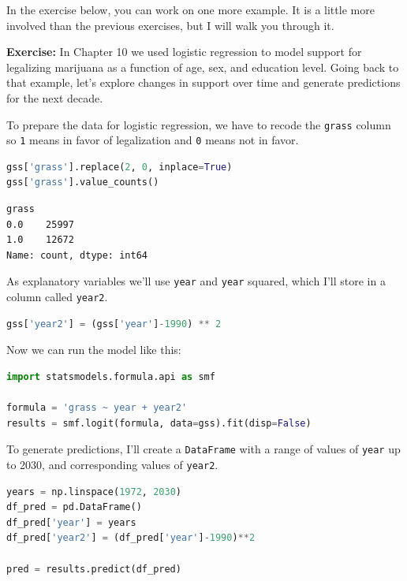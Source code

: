 In the exercise below, you can work on one more example. It is a little
more involved than the previous exercises, but I will walk you through
it.

\textbf{Exercise:} In Chapter 10 we used logistic regression to model
support for legalizing marijuana as a function of age, sex, and
education level. Going back to that example, let's explore changes in
support over time and generate predictions for the next decade.

To prepare the data for logistic regression, we have to recode the
\passthrough{\lstinline!grass!} column so \passthrough{\lstinline!1!}
means in favor of legalization and \passthrough{\lstinline!0!} means not
in favor.

\begin{lstlisting}[language=Python,style=source]
gss['grass'].replace(2, 0, inplace=True)
gss['grass'].value_counts()
\end{lstlisting}

\begin{lstlisting}[style=output]
grass
0.0    25997
1.0    12672
Name: count, dtype: int64
\end{lstlisting}

As explanatory variables we'll use \passthrough{\lstinline!year!} and
\passthrough{\lstinline!year!} squared, which I'll store in a column
called \passthrough{\lstinline!year2!}.

\begin{lstlisting}[language=Python,style=source]
gss['year2'] = (gss['year']-1990) ** 2
\end{lstlisting}

Now we can run the model like this:

\begin{lstlisting}[language=Python,style=source]
import statsmodels.formula.api as smf

formula = 'grass ~ year + year2'
results = smf.logit(formula, data=gss).fit(disp=False)
\end{lstlisting}

To generate predictions, I'll create a
\passthrough{\lstinline!DataFrame!} with a range of values of
\passthrough{\lstinline!year!} up to 2030, and corresponding values of
\passthrough{\lstinline!year2!}.

\begin{lstlisting}[language=Python,style=source]
years = np.linspace(1972, 2030)
df_pred = pd.DataFrame()
df_pred['year'] = years
df_pred['year2'] = (df_pred['year']-1990)**2

pred = results.predict(df_pred)
\end{lstlisting}

